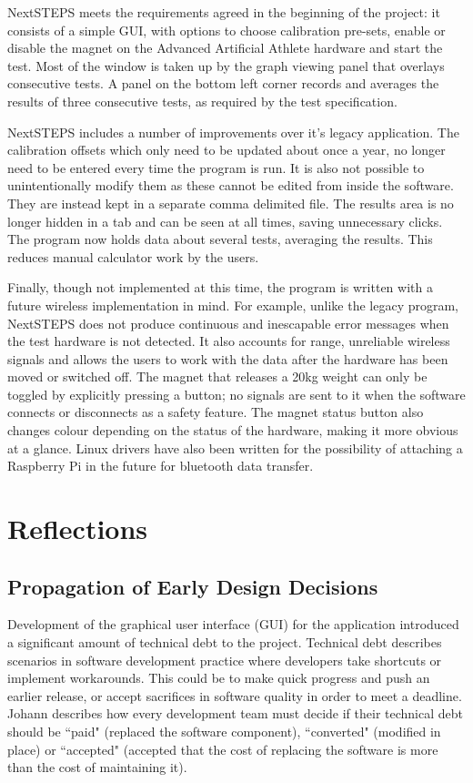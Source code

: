 \documentclass{l3proj}
\begin{document}
NextSTEPS meets the requirements agreed in the beginning of the project: it consists of a simple GUI, with options to choose calibration pre-sets, enable or disable the magnet on the Advanced Artificial Athlete hardware and start the test. Most of the window is taken up by the graph viewing panel that overlays consecutive tests. A panel on the bottom left corner records and averages the results of three consecutive tests, as required by the test specification\cite{fifa}.

NextSTEPS includes a number of improvements over it's legacy application. The calibration offsets which only need to be updated about once a year, no longer need to be entered every time the program is run. It is also not possible to unintentionally modify them as these cannot be edited from inside the software. They are instead kept in a separate comma delimited file. The results area is no longer hidden in a tab and can be seen at all times, saving unnecessary clicks. The program now holds data about several tests, averaging the results. This reduces manual calculator work by the users.

Finally, though not implemented at this time, the program is written with a future wireless implementation in mind. For example, unlike the legacy program, NextSTEPS does not produce continuous and inescapable error messages when the test hardware is not detected. It also accounts for range, unreliable wireless signals and allows the users to work with the data after the hardware has been moved or switched off. The magnet that releases a 20kg weight can only be toggled by explicitly pressing a button; no signals are sent to it when the software connects or disconnects as a safety feature. The magnet status button also changes colour depending on the status of the hardware, making it more obvious at a glance. Linux drivers have also been written for the possibility of attaching a Raspberry Pi in the future for bluetooth data transfer. 
\section{Reflections}
\subsection{Propagation of Early Design Decisions}
\label{subsection:prop}
Development of the graphical user interface (GUI) for the application introduced a significant amount of technical debt to the project. Technical debt describes scenarios in software development practice where developers take shortcuts or implement workarounds\cite{yli-huumo}. This could be to make quick progress and push an earlier release\cite{kruchten}, or accept sacrifices in software quality in order to meet a deadline\cite{zazworka}. Johann describes how every development team must decide if their technical debt should be ``paid" (replaced the software component), ``converted" (modified in place) or ``accepted" (accepted that the cost of replacing the software is more than the cost of maintaining it)\cite{wolff}.
\end{document}
